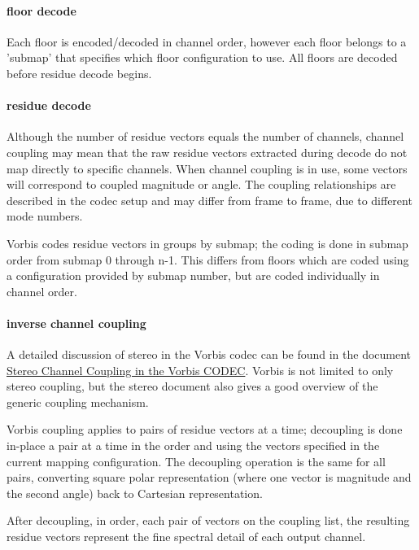 \paragraph{floor decode}
Each floor is encoded/decoded in channel order, however each floor
belongs to a 'submap' that specifies which floor configuration to
use.  All floors are decoded before residue decode begins.


\paragraph{residue decode}

Although the number of residue vectors equals the number of channels,
channel coupling may mean that the raw residue vectors extracted
during decode do not map directly to specific channels.  When channel
coupling is in use, some vectors will correspond to coupled magnitude
or angle.  The coupling relationships are described in the codec setup
and may differ from frame to frame, due to different mode numbers.

Vorbis codes residue vectors in groups by submap; the coding is done
in submap order from submap 0 through n-1.  This differs from floors
which are coded using a configuration provided by submap number, but
are coded individually in channel order.



\paragraph{inverse channel coupling}

A detailed discussion of stereo in the Vorbis codec can be found in
the document \href{stereo.html}{Stereo Channel Coupling in the
Vorbis CODEC}.  Vorbis is not limited to only stereo coupling, but
the stereo document also gives a good overview of the generic coupling
mechanism.

Vorbis coupling applies to pairs of residue vectors at a time;
decoupling is done in-place a pair at a time in the order and using
the vectors specified in the current mapping configuration.  The
decoupling operation is the same for all pairs, converting square
polar representation (where one vector is magnitude and the second
angle) back to Cartesian representation.

After decoupling, in order, each pair of vectors on the coupling list,
the resulting residue vectors represent the fine spectral detail
of each output channel.



